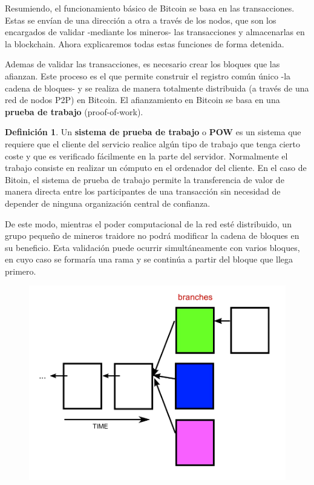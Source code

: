 \documentclass[twoside]{article}
\theoremstyle{definition}
\newtheorem{defi}[teorema]{Definición}
\begin{document}
Resumiendo, el funcionamiento básico de Bitcoin se basa en las transacciones. Estas se envían de una dirección a otra a través de los nodos, que son los encargados de validar -mediante los mineros- las transacciones y almacenarlas en la blockchain. Ahora explicaremos todas estas funciones de forma detenida.


Ademas de validar las transacciones, es necesario crear los bloques que las afianzan. Este proceso es el que permite construir el registro común único  -la cadena de bloques- y se realiza de manera totalmente distribuida (a través de una red de nodos P2P) en Bitcoin. El afianzamiento en Bitcoin se basa en una \textbf{prueba de trabajo} (proof-of-work). 
\begin{defi} Un \textbf{sistema de prueba de trabajo} o \textbf{POW} es un sistema que requiere que el cliente del servicio realice algún tipo de trabajo que tenga cierto coste y que es verificado fácilmente en la parte del servidor. Normalmente el trabajo consiste en realizar un cómputo en el ordenador del cliente. En el caso de Bitoin, el sistema de prueba de trabajo permite la transferencia de valor de manera directa entre los participantes de una transacción sin necesidad de depender de ninguna organización central de confianza. 
\end{defi}
De este modo, mientras el poder computacional de la red esté distribuido, un grupo pequeño de mineros traidore no podrá modificar la cadena de bloques en su beneficio. Esta validación puede ocurrir simultáneamente con varios bloques, en cuyo caso se formaría una rama y se continúa a partir del bloque que llega primero.
\begin{figure}[h!]
\includegraphics[scale=0.45]{rama}
\end{figure}
\end{document}
